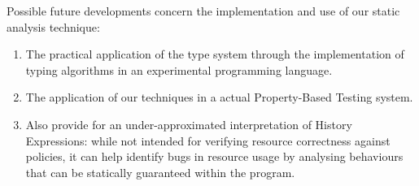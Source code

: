 Possible future developments concern the implementation and use of our static analysis technique:
\begin{enumerate}
    \item The practical application of the type system through the implementation of typing algorithms in an experimental programming language.
    \item The application of our techniques in a actual Property-Based Testing system.
    \item Also provide for an under-approximated interpretation of History Expressions: while not intended for verifying resource correctness against policies, it can help identify bugs in resource usage by analysing behaviours that can be statically guaranteed within the program.
\end{enumerate}